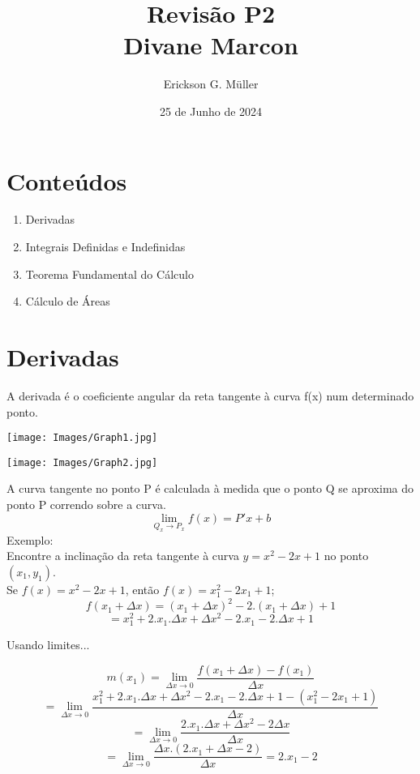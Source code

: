 \documentclass[ ]{article}
\title{Revisão P2 \\ Divane Marcon}
\author{Erickson G. Müller}
\date{25 de Junho de 2024}
\begin{document}
\maketitle

\section{Conteúdos}
	\begin{enumerate}
		\item Derivadas
		\item Integrais Definidas e Indefinidas
		\item Teorema Fundamental do Cálculo
		\item Cálculo de Áreas
	\end{enumerate}
\pagebreak

\section{Derivadas}
	A derivada é o coeficiente angular da reta tangente à curva f(x) num determinado ponto.\\
	
	\begin{minipage}{6 cm}
		\texttt{[image: Images/Graph1.jpg]}
	\end{minipage}		
	\begin{minipage}{6 cm}
		\texttt{[image: Images/Graph2.jpg]}
	\end{minipage}
	
	A curva tangente no ponto P	é calculada à medida que o ponto Q se aproxima do ponto P correndo sobre a curva.
	$$\lim_{Q_x\to P_x}f(x)=P'x+b$$
	Exemplo:\\
	Encontre a inclinação da reta tangente à curva $y=x^2-2x+1$ no ponto $(x_1,y_1)$.\\
	
	Se $f(x)=x^2-2x+1$, então $f(x)=x_1^2-2x_1+1$;\\
	$$f(x_1+\Delta x)=(x_1+\Delta x)^2 -2.(x_1+\Delta x) + 1$$
	$$=x_1^2+2.x_1.\Delta x + \Delta x^2 - 2.x_1 -2.\Delta x +1$$
	
	Usando limites...
	
	$$m(x_1) = \lim_{\Delta x \to 0}\dfrac{f(x_1+\Delta x)-f(x_1)}{\Delta x}$$
	$$=\lim_{\Delta x\to 0}\dfrac{x_1^2+2.x_1.\Delta x + \Delta x^2 - 2.x_1 -2.\Delta x +1 - (x_1^2-2x_1+1)}{\Delta x}$$
	$$=\lim_{\Delta x\to 0}\dfrac{2.x_1.\Delta x + \Delta x^2-2\Delta x}{\Delta x}$$
	$$ = \lim_{\Delta x\to 0}\dfrac{\Delta x.(2.x_1+\Delta x -2)}{\Delta x} = 2.x_1 - 2$$
	
\end{document}
